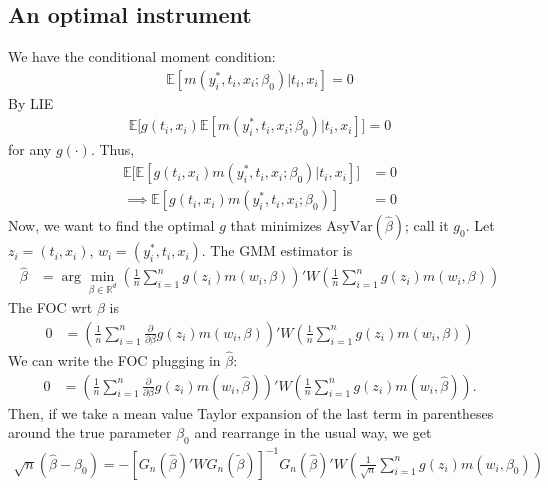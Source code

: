 \documentclass[12pt]{article}
\newcommand{\R}{\mathbb{R}}
\newcommand{\E}{\mathbb{E}}
\newcommand{\mtx}[1]{\ensuremath{\bm{\mathit{#1}}}}
\begin{document}
\subsection{An optimal instrument}
We have the conditional moment condition:
\begin{align*}
\E[m(y_i^*, t_i, \mtx{x}_i; \mtx{\beta}_0)|t_i,\mtx{x}_i] =0
\end{align*}
By LIE
\begin{align*}
\E\big[\mtx{g}(t_i,\mtx{x}_i)\E[m(y_i^*, t_i, \mtx{x}_i; \mtx{\beta}_0)|t_i,\mtx{x}_i]\big] =0
\end{align*}
for any $\mtx{g}(\cdot)$. Thus,
\begin{align*}
\E\big[\E[\mtx{g}(t_i,\mtx{x}_i)m(y_i^*, t_i, \mtx{x}_i; \mtx{\beta}_0)|t_i,\mtx{x}_i]\big] &=0\\
\implies \E[\mtx{g}(t_i,\mtx{x}_i)m(y_i^*, t_i, \mtx{x}_i; \mtx{\beta}_0)] &=0
\end{align*}
Now, we want to find the optimal $\mtx{g}$ that minimizes $\text{AsyVar}(\hat{\mtx{\beta}})$; call it $\mtx{g}_0$. Let $\mtx{z}_i=(t_i,\mtx{x}_i)$, $\mtx{w}_i = (y_i^*,t_i,\mtx{x}_i)$. The GMM estimator is
\begin{align*}
\hat{\mtx{\beta}} &= \arg \min_{\beta \in \R^d}\left(\frac{1}{n}\sum_{i=1}^n \mtx{g}(\mtx{z}_i)m(\mtx{w}_i,\mtx{\beta})\right)'\mtx{W} \left(\frac{1}{n}\sum_{i=1}^n \mtx{g}(\mtx{z}_i)m(\mtx{w}_i,\mtx{\beta})\right)
\end{align*}
The FOC wrt $\mtx{\beta}$ is
\begin{align*}
0 &= \left(\frac{1}{n}\sum_{i=1}^n \frac{\partial}{\partial \beta}\mtx{g}(\mtx{z}_i)m(\mtx{w}_i,\mtx{\beta})\right)'\mtx{W}\left(\frac{1}{n}\sum_{i=1}^n \mtx{g}(\mtx{z}_i)m(\mtx{w}_i,\mtx{\beta})\right)
\end{align*}
We can write the FOC plugging in $\hat{\mtx{\beta}}$:
\begin{align*}
0 &= \left(\frac{1}{n}\sum_{i=1}^n \frac{\partial}{\partial \beta}\mtx{g}(\mtx{z}_i)m(\mtx{w}_i,\hat{\mtx{\beta}})\right)'\mtx{W}\left(\frac{1}{n}\sum_{i=1}^n \mtx{g}(\mtx{z}_i)m(\mtx{w}_i,\hat{\mtx{\beta}})\right).
\end{align*}
Then, if we take a mean value Taylor expansion of the last term in parentheses around the true parameter $\mtx{\beta}_0$ and rearrange in the usual way, we get
\begin{align*}
\sqrt{n}(\hat{\mtx{\beta}} - \mtx{\beta}_0) = -\left[\mtx{G}_n(\hat{\mtx{\beta}})'\mtx{W}\mtx{G}_n(\tilde{\mtx{\beta}})\right]^{-1}\mtx{G}_n(\hat{\mtx{\beta}})'\mtx{W}\left( \frac{1}{\sqrt{n}} \sum_{i=1}^n \mtx{g}(\mtx{z}_i)m(\mtx{w}_i,\mtx{\beta}_0)\right)
\end{align*}
\end{document}
